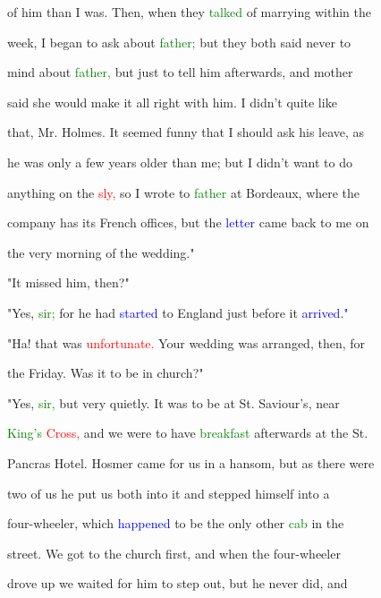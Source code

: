  of him than I was. Then, when they \textcolor{green}{talked} of \textcolor{BurntOrange}{marrying} within the

 week, I began to ask about \textcolor{green}{father;} but they both said never to

 mind about \textcolor{green}{father,} but just to tell him afterwards, and \textcolor{BurntOrange}{mother}

 said she would make it all right with him. I didn't quite like

 that, Mr. Holmes. It seemed funny that I should ask his \textcolor{BurntOrange}{leave,} as

 he was only a few years older than me; but I didn't want to do

 anything on the \textcolor{red}{sly,} so I wrote to \textcolor{green}{father} at Bordeaux, where the

 company has its French offices, but the \textcolor{blue}{letter} came back to me on

 the very morning of the wedding."



 "It missed him, then?"



 "Yes, \textcolor{green}{sir;} for he had \textcolor{blue}{started} to England just before it \textcolor{blue}{arrived."}



 "Ha! that was \textcolor{red}{unfortunate.} Your wedding was arranged, then, for

 the Friday. Was it to be in \textcolor{BurntOrange}{church?"}



 "Yes, \textcolor{green}{sir,} but very quietly. It was to be at St. Saviour's, near

 \textcolor{green}{King's} \textcolor{red}{Cross,} and we were to have \textcolor{green}{breakfast} afterwards at the St.

 Pancras Hotel. Hosmer came for us in a hansom, but as there were

 two of us he put us both into it and stepped himself into a

 four-wheeler, which \textcolor{blue}{happened} to be the only other \textcolor{green}{cab} in the

 street. We got to the \textcolor{BurntOrange}{church} first, and when the four-wheeler

 drove up we \textcolor{BurntOrange}{waited} for him to step out, but he never did, and

